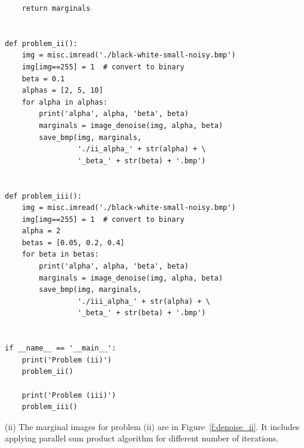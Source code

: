 \documentclass{article}
\begin{document}
\begin{lstlisting}
    return marginals


def problem_ii():
    img = misc.imread('./black-white-small-noisy.bmp')
    img[img==255] = 1  # convert to binary
    beta = 0.1
    alphas = [2, 5, 10]
    for alpha in alphas:
        print('alpha', alpha, 'beta', beta)
        marginals = image_denoise(img, alpha, beta)
        save_bmp(img, marginals,
                 './ii_alpha_' + str(alpha) + \
                 '_beta_' + str(beta) + '.bmp')


def problem_iii():
    img = misc.imread('./black-white-small-noisy.bmp')
    img[img==255] = 1  # convert to binary
    alpha = 2
    betas = [0.05, 0.2, 0.4]
    for beta in betas:
        print('alpha', alpha, 'beta', beta)
        marginals = image_denoise(img, alpha, beta)
        save_bmp(img, marginals,
                 './iii_alpha_' + str(alpha) + \
                 '_beta_' + str(beta) + '.bmp')


if __name__ == '__main__':
    print('Problem (ii)')
    problem_ii()

    print('Problem (iii)')
    problem_iii()

\end{lstlisting}
(ii)
The marginal images for problem (ii) are in Figure~\ref{f:denoise_ii}.
It includes applying parallel sum product algorithm for different number
of iterations.
\end{document}
